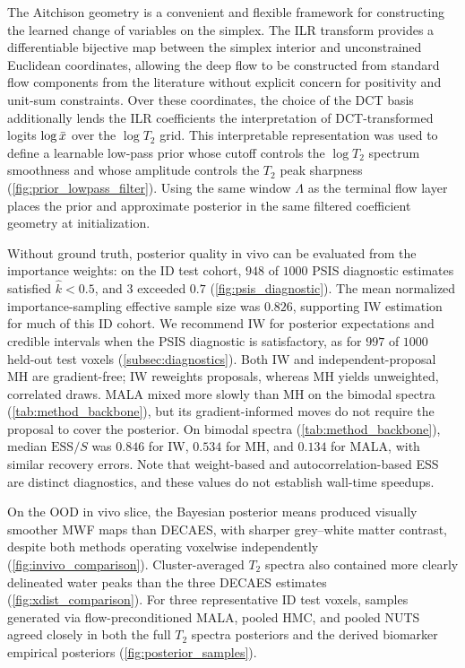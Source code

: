 The Aitchison geometry is a convenient and flexible framework for constructing the learned change of variables on the simplex.
The \gls*{ILR} transform provides a differentiable bijective map between the simplex interior and unconstrained Euclidean coordinates, allowing the deep flow to be constructed from standard flow components from the literature without explicit concern for positivity and unit-sum constraints.
Over these coordinates, the choice of the \gls*{DCT} basis additionally lends the \gls*{ILR} coefficients the interpretation of \gls*{DCT}-transformed logits $\log \bar{x}$ over the $\log T_2$ grid.
This interpretable representation was used to define a learnable low-pass prior whose cutoff controls the $\log T_2$ spectrum smoothness and whose amplitude controls the $T_2$ peak sharpness (\cref{fig:prior_lowpass_filter}).
Using the same window $\Lambda$ as the terminal flow layer places the prior and approximate posterior in the same filtered coefficient geometry at initialization.

Without ground truth, posterior quality in vivo can be evaluated from the importance weights:
on the ID test cohort, $948$ of $\num{1000}$ \gls*{PSIS} diagnostic estimates satisfied $\hat{k}<0.5$, and $3$ exceeded $0.7$ (\cref{fig:psis_diagnostic}).
The mean normalized importance-sampling effective sample size was $0.826$, supporting \gls*{IW} estimation for much of this ID cohort.
We recommend \gls*{IW} for posterior expectations and credible intervals when the \gls*{PSIS} diagnostic is satisfactory, as for $997$ of $\num{1000}$ held-out test voxels (\cref{subsec:diagnostics}).
Both \gls*{IW} and independent-proposal \gls*{MH} are gradient-free;
\gls*{IW} reweights proposals, whereas \gls*{MH} yields unweighted, correlated draws.
\gls*{MALA} mixed more slowly than \gls*{MH} on the bimodal spectra (\cref{tab:method_backbone}), but its gradient-informed moves do not require the proposal to cover the posterior.
On bimodal spectra (\cref{tab:method_backbone}), median $\mathrm{ESS}/S$ was $0.846$ for \gls*{IW}, $0.534$ for \gls*{MH}, and $0.134$ for \gls*{MALA}, with similar recovery errors.
Note that weight-based and autocorrelation-based ESS are distinct diagnostics, and these values do not establish wall-time speedups.

On the OOD in vivo slice, the Bayesian posterior means produced visually smoother \gls*{MWF} maps than \gls*{DECAES}, with sharper grey--white matter contrast, despite both methods operating voxelwise independently (\cref{fig:invivo_comparison}).
Cluster-averaged $T_2$ spectra also contained more clearly delineated water peaks than the three \gls*{DECAES} estimates (\cref{fig:xdist_comparison}).
For three representative ID test voxels, samples generated via flow-preconditioned \gls*{MALA}, pooled \gls*{HMC}, and pooled \gls*{NUTS} agreed closely in both the full $T_2$ spectra posteriors and the derived biomarker empirical posteriors (\cref{fig:posterior_samples}).

